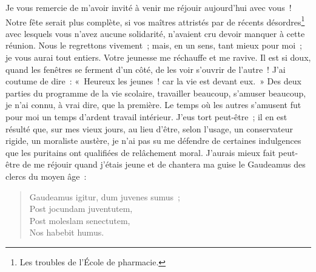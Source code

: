 \documentclass[french,twoside]{book} %
\newcommand\orgName[1]{#1}
\newcommand{\dateline}[1]{\medskip{\RaggedLeft{#1}\par}\bigskip}
\newcommand{\salute}[1]{\bigbreak{#1}\par\medbreak}
\begin{document}
\dateline{15 mai 1886}

\salute{Messieurs,}
\noindent Je vous remercie de m’avoir invité à venir me réjouir aujourd’hui avec vous ! Notre fête serait plus complète, si vos maîtres attristés par de récents désordres\footnote{ Les troubles de l’{\orgName École de pharmacie}.} avec lesquels vous n’avez aucune solidarité, n’avaient cru devoir manquer à cette réunion. Nous le regrettons vivement ; mais, en un sens, tant mieux pour moi ; je vous aurai tout entiers. Votre jeunesse me réchauffe et me ravive. Il est si doux, quand les fenêtres se ferment d’un côté, de les voir s’ouvrir de l’autre ! J’ai coutume de dire : « Heureux les jeunes ! car la vie est devant eux. » Des deux parties du programme de la vie scolaire, travailler beaucoup, s’amuser beaucoup, je n’ai connu, à vrai dire, que la première. Le temps où les autres s’amusent fut pour moi un temps d’ardent travail intérieur. J’eus tort peut-être ; il en est résulté que, sur mes vieux jours, au lieu d’être, selon l’usage, un conservateur rigide, un moraliste austère, je n’ai pas su me défendre de certaines indulgences que les puritains ont qualifiées de relâchement moral. J’aurais mieux fait peut-être de me réjouir quand j’étais jeune et de chantera ma guise le Gaudeamus des clercs du moyen âge :\par


\begin{verse}
Gaudeamus igitur, dum juvenes sumus ;\\
Post jocundam juventutem,\\
Post moleslam senectutem,\\
Nos habebit humus.\\
\end{verse}
\end{document}
